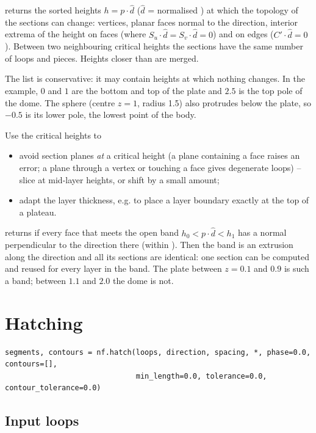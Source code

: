  returns the sorted heights $h = p\cdot\hat d$ ($\hat d$ = normalised
) at which the topology of the sections can change: vertices, planar faces
normal to the direction, interior extrema of the height on faces (where
$S_u\cdot\hat d = S_v\cdot\hat d = 0$) and on edges ($C'\cdot\hat d = 0$). Between two
neighbouring critical heights the sections have the same number of loops and pieces. Heights
closer than  are merged.

The list is conservative: it may contain heights at which nothing changes. In the example,
$0$ and $1$ are the bottom and top of the plate and $2.5$ is the top pole of the dome. The
sphere (centre $z=1$, radius 1.5) also protrudes below the plate, so $-0.5$ is its lower pole,
the lowest point of the body.

Use the critical heights to
\begin{itemize}
\item avoid section planes \emph{at} a critical height (a plane containing a face raises an
error; a plane through a vertex or touching a face gives degenerate loops) -- slice at
mid-layer heights, or shift by a small amount;
\item adapt the layer thickness, e.g. to place a layer boundary exactly at the top of a
plateau.
\end{itemize}

 returns  if every face that
meets the open band $h_0 < p\cdot\hat d < h_1$ has a normal perpendicular to the direction
there (within ). Then the band is an extrusion along the direction and
all its sections are identical: one section can be computed and reused for every layer in the
band. The plate between $z=0.1$ and $0.9$ is such a band; between $1.1$ and $2.0$ the dome is
not.

\section{Hatching}\label{sec:hatch}

\begin{lstlisting}
segments, contours = nf.hatch(loops, direction, spacing, *, phase=0.0, contours=[],
                              min_length=0.0, tolerance=0.0, contour_tolerance=0.0)
\end{lstlisting}

\subsection{Input loops}

